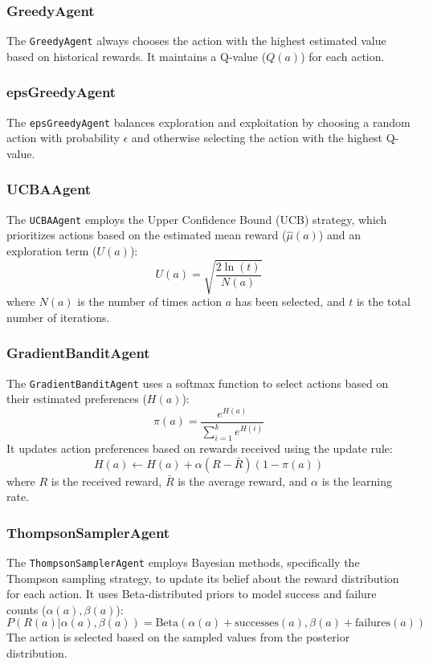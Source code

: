 \documentclass{article}
\begin{document}
\subsubsection{GreedyAgent}
The \texttt{GreedyAgent} always chooses the action with the highest estimated value based on historical rewards. It maintains a Q-value (\(Q(a)\)) for each action.

\subsubsection{epsGreedyAgent}
The \texttt{epsGreedyAgent} balances exploration and exploitation by choosing a random action with probability \(\epsilon\) and otherwise selecting the action with the highest Q-value.

\subsubsection{UCBAAgent}
The \texttt{UCBAAgent} employs the Upper Confidence Bound (UCB) strategy, which prioritizes actions based on the estimated mean reward (\(\hat{\mu}(a)\)) and an exploration term (\(U(a)\)):
\[ U(a) = \sqrt{\frac{2 \ln(t)}{N(a)}} \]
where \(N(a)\) is the number of times action \(a\) has been selected, and \(t\) is the total number of iterations.

\subsubsection{GradientBanditAgent}
The \texttt{GradientBanditAgent} uses a softmax function to select actions based on their estimated preferences (\(H(a)\)):
\[ \pi(a) = \frac{e^{H(a)}}{\sum_{i=1}^{k}e^{H(i)}} \]
It updates action preferences based on rewards received using the update rule:
\[ H(a) \leftarrow H(a) + \alpha (R - \bar{R}) (1 - \pi(a)) \]
where \(R\) is the received reward, \(\bar{R}\) is the average reward, and \(\alpha\) is the learning rate.

\subsubsection{ThompsonSamplerAgent}
The \texttt{ThompsonSamplerAgent} employs Bayesian methods, specifically the Thompson sampling strategy, to update its belief about the reward distribution for each action. It uses Beta-distributed priors to model success and failure counts (\(\alpha(a), \beta(a)\)):
\[ P(R(a) | \alpha(a), \beta(a)) = \text{Beta}(\alpha(a) + \text{successes}(a), \beta(a) + \text{failures}(a)) \]
The action is selected based on the sampled values from the posterior distribution.
\end{document}
